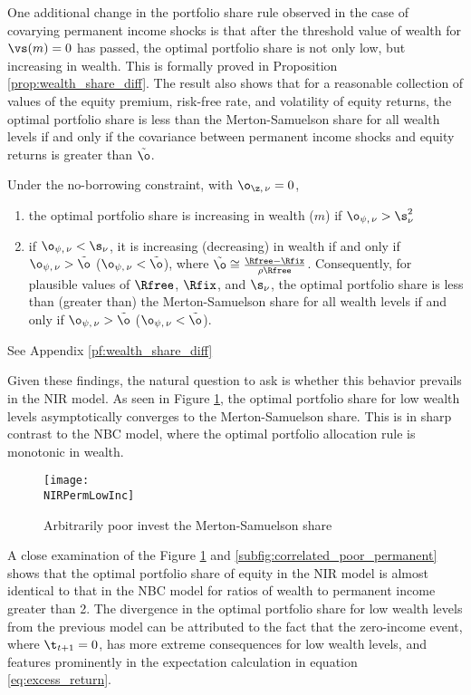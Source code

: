 One additional change in the portfolio share rule observed in the case of covarying permanent income shocks is that after the threshold value of wealth for $\vs(m) = 0$ has passed, the optimal portfolio share is not only low, but increasing in wealth. This is formally proved in Proposition \ref{prop:wealth_share_diff}. The result also shows that for a reasonable collection of values of the equity premium, risk-free rate, and volatility of equity returns, the optimal portfolio share is less than the Merton-Samuelson share for all wealth levels if and only if the covariance between permanent income shocks and equity returns is greater than $\tilde{\o}$.

\begin{prop}\label{prop:wealth_share_diff}
    Under the no-borrowing constraint, with $\o_{\z,\,\nu} = 0$, 
    \begin{enumerate}[topsep=0pt, itemsep=0pt, label=(\roman*)]
        \item the optimal portfolio share is increasing in wealth ($m$) if $\o_{\psi,\,\nu} > \s_{\nu}^2$
        \item if $\o_{\psi,\,\nu} < \s_{\nu}$, it is increasing (decreasing) in wealth if and only if $\o_{\psi,\,\nu} > \tilde{\o}$ ($\o_{\psi,\,\nu} < \tilde{\o}$), where $\tilde{\o} \cong \frac{\Rfree - \Rfix}{\rho\Rfree}$. Consequently, for plausible values of $\Rfree$, $\Rfix$, and $\s_{\nu}$, the optimal portfolio share is less than (greater than) the Merton-Samuelson share for all wealth levels if and only if $\o_{\psi,\,\nu} > \tilde{\o}$ ($\o_{\psi,\,\nu} < \tilde{\o}$).
    \end{enumerate}
\end{prop}

\pf See Appendix \ref{pf:wealth_share_diff}

Given these findings, the natural question to ask is whether this behavior prevails in the NIR model. As seen in Figure \ref{fig:zeroInc_poor}, the optimal portfolio share for low wealth levels asymptotically converges to the Merton-Samuelson share. This is in sharp contrast to the NBC model, where the optimal portfolio allocation rule is monotonic in wealth.

\begin{figure}[h]
    \centering
    \texttt{[image: \\NIRPermLowInc]}
    \caption{Arbitrarily poor invest the Merton-Samuelson share}
    \label{fig:zeroInc_poor}
\end{figure}

A close examination of the Figure \ref{fig:zeroInc_poor} and \ref{subfig:correlated_poor_permanent} shows that the optimal portfolio share of equity in the NIR model is almost identical to that in the NBC model for ratios of wealth to permanent income greater than 2. The divergence in the optimal portfolio share for low wealth levels from the previous model can be attributed to the fact that the zero-income event, where $\t_{t+1} = 0$, has more extreme consequences for low wealth levels, and features prominently in the expectation calculation in equation \eqref{eq:excess_return}.

